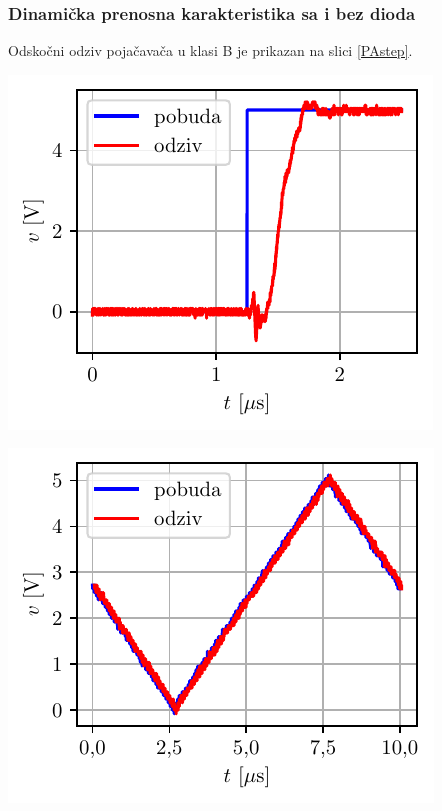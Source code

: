 \documentclass[a4paper, 12pt, diplomski]{etf}
\begin{document}
\subsubsection{Dinamička prenosna karakteristika sa i bez dioda}

Odskočni odziv pojačavača u klasi B je prikazan na slici \ref{PAstep}.

\begin{center}
\begin{minipage}{0.45\textwidth}
\centering
\includegraphics[scale=1]{fig_osc/PAstep.pdf}
\label{PAstep}
\end{minipage}\hfill
\begin{minipage}{0.45\textwidth}
\includegraphics[scale=1]{fig_osc/PAramp.pdf} 
\label{PAramp} 
\end{minipage}
\end{center}
\end{document}
